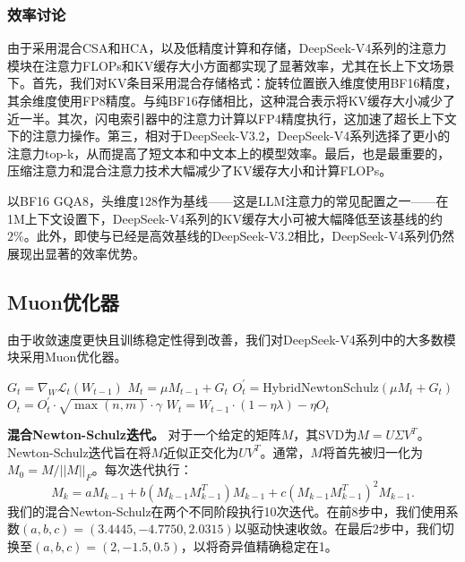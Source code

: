 \documentclass[11pt,a4paper]{article}
\newcommand{\dsvfour}{DeepSeek-V4}
\newcommand{\dsvthreetwo}{DeepSeek-V3.2}
\begin{document}
\subsubsection{效率讨论}

由于采用混合CSA和HCA，以及低精度计算和存储，\dsvfour 系列的注意力模块在注意力FLOPs和KV缓存大小方面都实现了显著效率，尤其在长上下文场景下。首先，我们对KV条目采用混合存储格式：旋转位置嵌入维度使用BF16精度，其余维度使用FP8精度。与纯BF16存储相比，这种混合表示将KV缓存大小减少了近一半。其次，闪电索引器中的注意力计算以FP4精度执行，这加速了超长上下文下的注意力操作。第三，相对于\dsvthreetwo，\dsvfour 系列选择了更小的注意力top-k，从而提高了短文本和中文本上的模型效率。最后，也是最重要的，压缩注意力和混合注意力技术大幅减少了KV缓存大小和计算FLOPs。

以BF16 GQA8，头维度128作为基线——这是LLM注意力的常见配置之一——在1M上下文设置下，\dsvfour 系列的KV缓存大小可被大幅降低至该基线的约\(2\%\)。此外，即使与已经是高效基线的\dsvthreetwo 相比，\dsvfour 系列仍然展现出显著的效率优势。

\subsection{Muon优化器}

由于收敛速度更快且训练稳定性得到改善，我们对\dsvfour 系列中的大多数模块采用Muon优化器。

\begin{algorithm}
\caption{Muon优化}
\begin{algorithmic}[1]
        \State \(G_{t} = \nabla_{W} \mathcal{L}_{t}(W_{t-1})\) 
        \State \(M_{t} = \mu M_{t-1} + G_{t}\) 
        \State \(O_{t}^{\prime} = \text{HybridNewtonSchulz}(\mu M_{t} + G_{t})\) 
        \State \(O_{t} = O_{t}^{\prime} \cdot \sqrt{\max(n, m)} \cdot \gamma\) 
        \State \(W_{t} = W_{t-1} \cdot (1 - \eta \lambda) - \eta O_{t}\) 
    \EndFor
\EndFor
\end{algorithmic}
\end{algorithm}

\textbf{混合Newton-Schulz迭代。} 对于一个给定的矩阵\(M\)，其SVD为\(M = U \Sigma V^{T}\)。Newton-Schulz迭代旨在将\(M\)近似正交化为\(UV^{T}\)。通常，\(M\)将首先被归一化为\(M_{0} = M / ||M||_{F}\)。每次迭代执行：
\[M_{k} = a M_{k-1} + b(M_{k-1} M_{k-1}^{T}) M_{k-1} + c(M_{k-1} M_{k-1}^{T})^{2} M_{k-1}.\]
我们的混合Newton-Schulz在两个不同阶段执行10次迭代。在前8步中，我们使用系数\((a, b, c) = (3.4445, -4.7750, 2.0315)\)以驱动快速收敛。在最后2步中，我们切换至\((a, b, c) = (2, -1.5, 0.5)\)，以将奇异值精确稳定在1。
\end{document}
